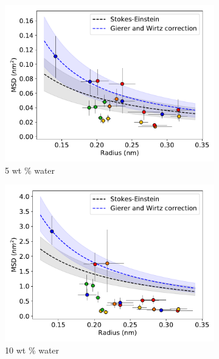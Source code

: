 \documentclass{article}
\begin{document}
\begin{figure}
\begin{subfigure}{0.45\textwidth}
  \includegraphics[width=\textwidth]{msd_radius_5wt.pdf} 
  \caption{5 wt \% water}\label{fig:msd_radius_5wt}
  \end{subfigure}
  \begin{subfigure}{0.45\textwidth}
  \includegraphics[width=\textwidth]{msd_radius_10wt.pdf} 
  \caption{10 wt \% water}\label{fig:msd_radius_10wt}
  \end{subfigure}
  \caption{}\label{fig:msds}
  \end{figure}  
  
\end{document}
